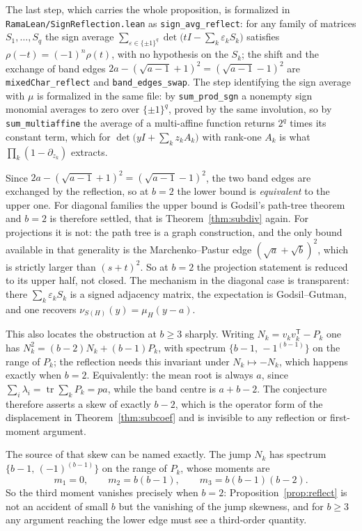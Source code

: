 \documentclass[11pt]{article}
\theoremstyle{remark}
\begin{document}
The last step, which carries the whole proposition, is formalized in
\texttt{RamaLean/SignReflection.lean} as \texttt{sign\_avg\_reflect}: for any family of
matrices $S_1,\dots,S_q$ the sign average
$\sum_{\varepsilon\in\{\pm1\}^q}\det\bigl(tI-\sum_k\varepsilon_kS_k\bigr)$ satisfies
$\rho(-t)=(-1)^n\rho(t)$, with no hypothesis on the $S_k$; the shift and the exchange
of band edges $2a-(\sqrt{a-1}+1)^2=(\sqrt{a-1}-1)^2$ are
\texttt{mixedChar\_reflect} and \texttt{band\_edges\_swap}. The step identifying the
sign average with $\mu$ is formalized in the same file: by \texttt{sum\_prod\_sgn} a
nonempty sign monomial averages to zero over $\{\pm1\}^q$, proved by the same
involution, so by \texttt{sum\_multiaffine} the average of a multi-affine function
returns $2^q$ times its constant term, which for
$\det\bigl(yI+\sum_kz_kA_k\bigr)$ with rank-one $A_k$ is what
$\prod_k(1-\partial_{z_k})$ extracts.

Since $2a-(\sqrt{a-1}+1)^2=(\sqrt{a-1}-1)^2$, the two band edges are exchanged by
the reflection, so at $b=2$ the lower bound is \emph{equivalent} to the upper one.
For diagonal families the upper bound is Godsil's path-tree theorem and $b=2$ is
therefore settled, that is Theorem~\ref{thm:subdiv} again. For projections it is
not: the path tree is a graph construction, and the only bound available in that
generality is the Marchenko--Pastur edge $(\sqrt a+\sqrt b)^2$, which is strictly
larger than $(s+t)^2$. So at $b=2$ the projection statement is reduced to its upper
half, not closed. The mechanism in the diagonal case is transparent: there
$\sum_k\varepsilon_kS_k$ is a signed adjacency matrix, the expectation is
Godsil--Gutman, and one recovers $\nu_{S(H)}(y)=\mu_H(y-a)$.

This also locates the obstruction at $b\ge3$ sharply. Writing
$N_k=v_kv_k^{\mathsf T}-P_k$ one has $N_k^2=(b-2)N_k+(b-1)P_k$, with spectrum
$\{b-1,\,-1^{(b-1)}\}$ on the range of $P_k$; the reflection needs this invariant
under $N_k\mapsto-N_k$, which happens exactly when $b=2$. Equivalently: the mean
root is always $a$, since $\sum_i\lambda_i=\operatorname{tr}\sum_kP_k=pa$, while the
band centre is $a+b-2$. The conjecture therefore asserts a skew of exactly $b-2$,
which is the operator form of the displacement in Theorem~\ref{thm:subcoef} and is
invisible to any reflection or first-moment argument.

The source of that skew can be named exactly. The jump $N_k$ has spectrum
$\{b-1,\,(-1)^{(b-1)}\}$ on the range of $P_k$, whose moments are
\[
m_1=0,\qquad m_2=b(b-1),\qquad m_3=b(b-1)(b-2).
\]
So the third moment vanishes precisely when $b=2$: Proposition~\ref{prop:reflect}
is not an accident of small $b$ but the vanishing of the jump skewness, and for
$b\ge3$ any argument reaching the lower edge must see a third-order quantity.
\end{document}
